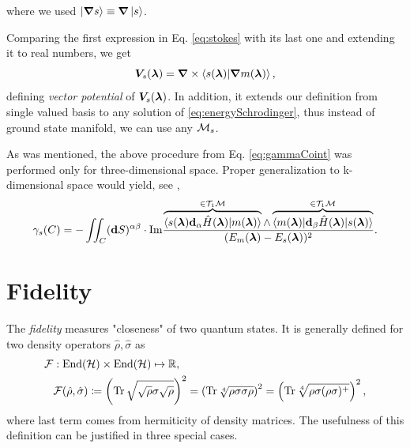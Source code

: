 where we used $\ket{\bm \nabla s}\equiv\bm \nabla \ket{ s}$. 

Comparing the first expression in Eq. \ref{eq:stokes} with its last one and extending it to real numbers, we get
\begin{equation}
    \bm V_s({\bm\lambda})=\bm \nabla\times\braket{s({\bm\lambda})|\bm \nabla m({\bm\lambda})}, 
    \label{eq:vectorPotentialDef}  
\end{equation}
defining \emph{vector potential} of $\bm V_s({\bm\lambda})$. In addition, it extends our definition from single valued basis to any solution of \ref{eq:energySchrodinger}, thus instead of ground state manifold, we can use any $\mathcal{M}_s$.

As was mentioned, the above procedure from Eq. \ref{eq:gammaCoint} was performed only for three-dimensional space. Proper generalization to k-dimensional space would yield, see \citet{berry1984},
\begin{equation}
    \gamma_s(C) = -\iint_C (\bm{\mathrm{d}} S)^{\alpha\beta} \cdot\textrm{Im} \frac{
            \overbrace{\braket{s({\bm\lambda})\bm{\mathrm{d}}_\alpha \hat{H}({\bm\lambda}) |m({\bm\lambda})}}^{\in\mathcal{T}_1\mathcal{M}}\wedge \overbrace{\braket{m({\bm\lambda})|\bm{\mathrm{d}}_\beta\hat{H}({\bm\lambda})|s({\bm\lambda})}}^{\in\mathcal{T}_1\mathcal{M}}    
             }{
(E_m({\bm\lambda})-E_s({\bm\lambda}))^2
             }.
\end{equation}






\section{Fidelity}
The \emph{fidelity} measures "closeness" of two quantum states. It is generally defined for two density operators $\hat\rho, \hat\sigma$ as
\begin{equation}
    \begin{split}
        \mathcal F&: \operatorname{End}(\mathcal{H})\times \operatorname{End}(\mathcal{H})\mapsto \mathbb{R}, \\
        &\mathcal F(\hat\rho,\hat\sigma)\coloneqq \left(\operatorname{\textrm{Tr}} \sqrt{\sqrt{\rho}\sigma\sqrt{\rho}}\right)^2 = \left(\operatorname{\textrm{Tr}}\sqrt[4]{\rho \sigma \sigma \rho}\right)^2= \left(\operatorname{\textrm{Tr}}\sqrt[4]{\rho \sigma (\rho\sigma)^+ }\right)^2,
    \end{split}
    \label{eq:fidelitydef}
\end{equation}
where last term comes from hermiticity of density matrices.
The usefulness of this definition can be justified in three special cases.

